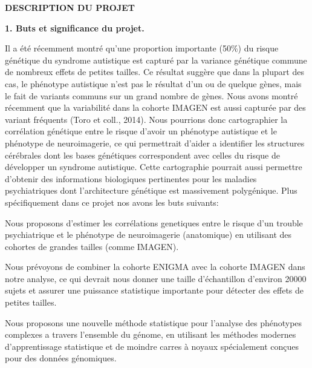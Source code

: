 \documentclass[11pt]{article}
\begin{document}
\begin{center}
{\large \bf DESCRIPTION DU PROJET}
\end{center}

\noindent
{\large \textbf{1. Buts et significance du projet.}}
\medskip

\noindent
Il a été récemment montré qu'une proportion importante (50\%) du risque génétique du syndrome autistique est capturé par la variance génétique commune de nombreux effets de petites tailles. Ce résultat suggère que dans la plupart des cas, le phénotype autistique n'est pas le résultat d'un ou de quelque gènes, mais le fait de variants communs sur un grand nombre de gènes. Nous avons montré récemment que la variabilité dans la cohorte IMAGEN est aussi capturée par des variant fréquents (Toro et coll., 2014). Nous pourrions donc cartographier la corrélation génétique entre le risque d'avoir un phénotype autistique et le phénotype de neuroimagerie, ce qui permettrait d'aider a identifier les structures cérébrales dont les bases génétiques correspondent avec celles du risque de développer un syndrome autistique. Cette cartographie pourrait aussi permettre d'obtenir des informations biologiques pertinentes pour les maladies psychiatriques dont l'architecture génétique est massivement polygénique. Plus spécifiquement dans ce projet nos avons les buts suivants:

\newlength{\adjitsepb}
\setlength{\adjitsepb}{0.06in}

\vspace{-0.075in}
\begin{list}{[]}{\setlength{\parsep}{0in}\setlength{\itemsep}{\adjitsepb}\setlength{\itemindent}{0in}}
	\item Nous proposons d'estimer les corrélations genetiques entre le risque d'un trouble psychiatrique et le phénotype de neuroimagerie (anatomique) en utilisant des cohortes de grandes tailles (comme IMAGEN). 
	\item Nous prévoyons de combiner la cohorte ENIGMA avec la cohorte IMAGEN dans notre analyse, ce qui devrait nous donner une taille d'échantillon d'environ 20000 sujets et assurer une puissance statistique importante pour détecter des effets de petites tailles. 
	\item Nous proposons une nouvelle méthode statistique pour l'analyse des phénotypes complexes a travers l'ensemble du génome, en utilisant les méthodes modernes d'apprentissage statistique et de moindre carres à noyaux spécialement conçues pour des données génomiques. 
\end{list}
\end{document}
